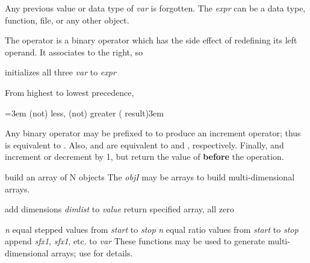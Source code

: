 Any previous value or data type of {\it var} is forgotten.
The {\it expr\/} can be a data type, function, file, or any other object.

The \kbd{=} operator is a binary operator which has the side effect of
redefining its left operand.  It associates to the right, so

       {initializes all three {\it var\/} to {\it expr}}


From highest to lowest precedence, 

\keyindent=3em
\func{>= < <= >}
     {(not) less, (not) greater ( result)\hglue3em}
\endindentedkeys

Any binary operator may be prefixed to \kbd{=} to produce an increment
operator; thus  is equivalent to .  Also, 
and  are equivalent to  and , respectively.
Finally,  and  increment or decrement  by 1, but
return the value of  {\bf before} the operation.


       {build an array of N objects}
The {\it objI} may be arrays to build multi-dimensional arrays.

       {add dimensions {\it dimlist\/} to {\it value}}
       {return specified array, all zero}

       {{\it n} equal stepped values from {\it start\/} to {\it stop}}
       {{\it n} equal ratio values from {\it start\/} to {\it stop}}
       {append {\it sfx1}, {\it sfx1}, etc. to {\it var}}
These functions may be used to generate multi-dimensional arrays;
 use  for details.

